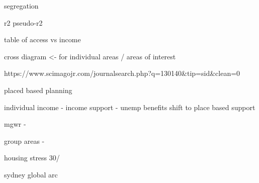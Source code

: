 segregation

r2
pseudo-r2

table of access vs income

cross diagram <- for individual areas / areas of interest

https://www.scimagojr.com/journalsearch.php?q=130140&tip=sid&clean=0

placed based planning

individual income - income support - unemp benefits
shift to place based support

mgwr - 

group areas -

housing stress 30/%

sydney global arc